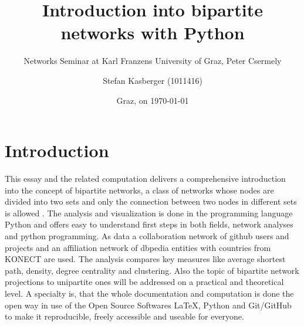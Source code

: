 \documentclass[
a4paper,     %
12pt         %
]{scrartcl}  %
\title{Introduction into bipartite networks with Python}
\subtitle{Networks Seminar at Karl Franzens University of Graz, Peter Csermely}
\author{Stefan Kasberger (1011416)}
\date{Graz, on \today{}}
\begin{document}


\maketitle









\section{Introduction}
\label{sec:introduction}

This essay and the related computation delivers a comprehensive introduction into the concept of bipartite networks, a class of networks whose nodes are divided into two sets and only the connection between two nodes in different sets is allowed \citep{easley_networks_2010}. The analysis and visualization is done in the programming language Python and offers easy to understand first steps in both fields, network analyses and python programming. As data a collaboration network of github users and projects and an affiliation network of dbpedia entities with countries from KONECT are used. 
The analysis compares key measures like average shortest path, density, degree centrality and clustering. Also the topic of bipartite network projections to unipartite ones will be addressed on a practical and theoretical level. A specialty is, that the whole documentation and computation is done the open way in use of the Open Source Softwares LaTeX, Python and Git/GitHub to make it reproducible, freely accessible and useable for everyone.
\end{document}
